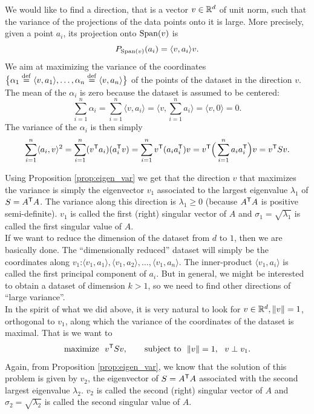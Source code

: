 \documentclass[11pt,nocut]{article}
\begin{document}
We would like to find a direction, that is a vector $v \in \mathbb{R}^d$ of unit norm, such that the variance of the projections of the data points onto it is large. More precisely, given a point $a_i$, its projection onto ${{\rm Span}}(v)$ is
$$
P_{{{\rm Span}}(v)}(a_i) = 
\langle v, a_i \rangle v.
$$
We aim at maximizing the variance of the coordinates $\big\{ \alpha_1 \overset{\rm def}{=} \langle v, a_1 \rangle, \dots , \alpha_n \overset{\rm def}{=} \langle v, a_n \rangle \big\}$ of the points of the dataset in the direction $v$. 
The mean of the $\alpha_i$ is zero because the dataset is assumed to be centered:
$$
\sum_{i=1}^n \alpha_i 
=
\sum_{i=1}^n \langle v, a_i \rangle
= \Big\langle v, \sum_{i=1}^n a_i \Big\rangle = \langle v,0 \rangle = 0.
$$
The variance of the $\alpha_i$ is then simply
$$
\sum_{i=1}^n \langle a_i, v \rangle^2
=
\sum_{i=1}^n (v^{{\sf T}}a_i)(a_i^{{\sf T}} v)
=
\sum_{i=1}^n v^{{\sf T}} (a_i a_i^{{\sf T}}) v
=
v^{{\sf T}} \Big(\sum_{i=1}^n a_i a_i^{{\sf T}}\Big) v
= v^{{\sf T}} S v.
$$

Using Proposition \ref{prop:eigen_var} we get that the direction $v$ that maximizes the variance is simply the eigenvector $v_1$ associated to the largest eigenvalue $\lambda_1$ of $S = A^{{\sf T}}A$. The variance along this direction is $\lambda_1 \geq 0$ (because $A^{{\sf T}}A$ is positive semi-definite).
$v_1$ is called the first (right) singular vector of $A$ and $\sigma_1 = \sqrt{\lambda_1}$ is called the first singular value of $A$.
\\

If we want to reduce the dimension of the dataset from $d$ to $1$, then we are basically done. The ``dimensionally reduced'' dataset will simply be the coordinates along $v_1$:$\langle v_1, a_1 \rangle, \langle v_1, a_2 \rangle, \dots, \langle v_1, a_n \rangle$.
The inner-product $\langle v_1, a_i \rangle$ is called the first principal component of $a_i$.
But in general, we might be interested to obtain a dataset of dimension $k >1$, so we need to find other directions of ``large variance''.
\\

In the spirit of what we did above, it is very natural to look for $v \in \mathbb{R}^d, \|v\| = 1$, orthogonal to $v_1$, along which the variance of the coordinates of the dataset is maximal.
That is we want to 
$$
\text{maximize} \ \ v^{\sT} S v, \qquad \text{subject to} \ \ \|v\| = 1, \ \ v \perp v_1.
$$
Again, from Proposition \ref{prop:eigen_var}, we know that the solution of this problem is given by $v_2$, the eigenvector of $S = A^{{\sf T}}A$ associated with the second largest eigenvalue $\lambda_2$.
$v_2$ is called the second (right) singular vector of $A$ and $\sigma_2 = \sqrt{\lambda_2}$ is called the second singular value of $A$.
\\
\end{document}
